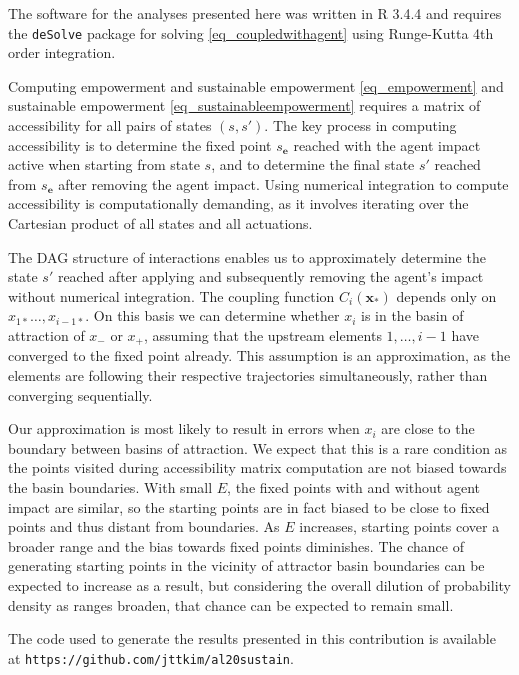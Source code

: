 \documentclass[conference]{IEEEtran}
\newcommand{\vectorsym}[1]{\ensuremath{\mathbf{#1}}}
\newcommand{\agentimpact}{\ensuremath{e}}
\newcommand{\couplingfunction}{\ensuremath{C}}
\newcommand{\impactstrength}{\ensuremath{E}}
\begin{document}
The software for the analyses presented here was written in R 3.4.4
\cite{RManual2018} and requires the \texttt{deSolve} package for
solving \eqref{eq_coupledwithagent} using Runge-Kutta 4th order
integration.

Computing empowerment and sustainable empowerment \eqref{eq_empowerment}
and sustainable empowerment \eqref{eq_sustainableempowerment} requires a
matrix of accessibility for all pairs of states $(s, s')$. The key
process in computing accessibility is to determine the fixed point
$s_{\vectorsym{\agentimpact}}$ reached with the agent impact active
when starting from state $s$, and to determine the final state $s'$
reached from $s_{\vectorsym{e}}$ after removing the agent impact.
Using numerical integration to compute accessibility is
computationally demanding, as it involves iterating over the Cartesian
product of all states and all actuations.

The DAG structure of interactions enables us to approximately
determine the state $s'$ reached after applying and subsequently
removing the agent's impact without numerical integration. The
coupling function $\couplingfunction_i(\vectorsym{x}_*)$ depends only
on $x_{1*} \ldots, x_{i-1*}$. On this basis we can determine whether
$x_i$ is in the basin of attraction of $x_{-}$ or $x_{+}$, assuming
that the upstream elements $1, \ldots, i - 1$ have converged to the
fixed point already. This assumption is an approximation, as the
elements are following their respective trajectories simultaneously,
rather than converging sequentially.

Our approximation is most likely to result in errors when $x_i$ are
close to the boundary between basins of attraction. We expect that
this is a rare condition as the points visited during accessibility
matrix computation are not biased towards the basin boundaries. With
small $\impactstrength$, the fixed points with and without agent impact are similar,
so the starting points are in fact biased to be close to fixed points
and thus distant from boundaries. As $\impactstrength$ increases, starting points
cover a broader range and the bias towards fixed points diminishes.
The chance of generating starting points in the vicinity of attractor
basin boundaries can be expected to increase as a result, but
considering the overall dilution of probability density as ranges
broaden, that chance can be expected to remain small.

The code used to generate the results presented in this contribution
is available at \texttt{https://github.com/jttkim/al20sustain}.
\end{document}

